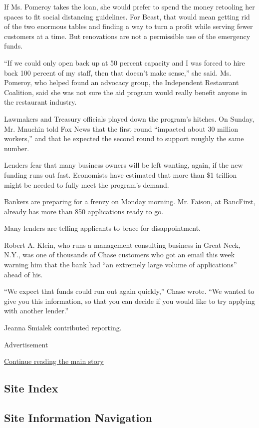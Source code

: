 If Ms. Pomeroy takes the loan, she would prefer to spend the money
retooling her spaces to fit social distancing guidelines. For Beast,
that would mean getting rid of the two enormous tables and finding a way
to turn a profit while serving fewer customers at a time. But
renovations are not a permissible use of the emergency funds.

``If we could only open back up at 50 percent capacity and I was forced
to hire back 100 percent of my staff, then that doesn't make sense,''
she said. Ms. Pomeroy, who helped found an advocacy group, the
Independent Restaurant Coalition, said she was not sure the aid program
would really benefit anyone in the restaurant industry.

Lawmakers and Treasury officials played down the program's hitches. On
Sunday, Mr. Mnuchin told Fox News that the first round ``impacted about
30 million workers,'' and that he expected the second round to support
roughly the same number.

Lenders fear that many business owners will be left wanting, again, if
the new funding runs out fast. Economists have estimated that more than
\$1 trillion might be needed to fully meet the program's demand.

Bankers are preparing for a frenzy on Monday morning. Mr. Faison, at
BancFirst, already has more than 850 applications ready to go.

Many lenders are telling applicants to brace for disappointment.

Robert A. Klein, who runs a management consulting business in Great
Neck, N.Y., was one of thousands of Chase customers who got an email
this week warning him that the bank had ``an extremely large volume of
applications'' ahead of his.

``We expect that funds could run out again quickly,'' Chase wrote. ``We
wanted to give you this information, so that you can decide if you would
like to try applying with another lender.''

Jeanna Smialek contributed reporting.

Advertisement

\protect\hyperlink{after-bottom}{Continue reading the main story}

\hypertarget{site-index}{%
\subsection{Site Index}\label{site-index}}

\hypertarget{site-information-navigation}{%
\subsection{Site Information
Navigation}\label{site-information-navigation}}

